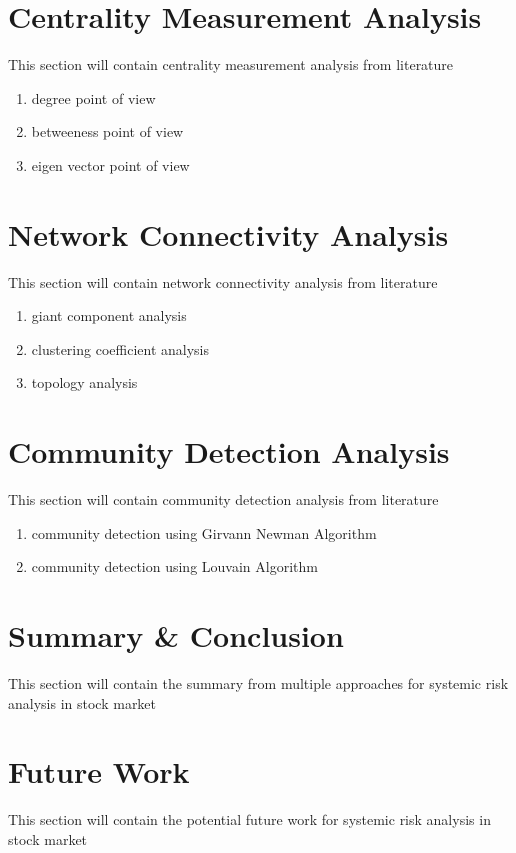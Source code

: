 \documentclass[a4paper,11pt]{article}
\begin{document}
\section{Centrality Measurement Analysis}
This section will contain centrality measurement analysis from literature
\begin{enumerate}
    \item degree point of view
    \item betweeness point of view
    \item eigen vector point of view
\end{enumerate}

\section{Network Connectivity Analysis}
This section will contain network connectivity analysis from literature
\begin{enumerate}
    \item giant component analysis
    \item clustering coefficient analysis
    \item topology analysis
\end{enumerate}

\section{Community Detection Analysis}
This section will contain community detection analysis from literature
\begin{enumerate}
    \item community detection using Girvann Newman Algorithm
    \item community detection using Louvain Algorithm
\end{enumerate}

\section{Summary \& Conclusion}
This section will contain the summary from multiple approaches for systemic risk analysis in stock market

\section{Future Work}
This section will contain the potential future work for systemic risk analysis in stock market



\small
\end{document}
